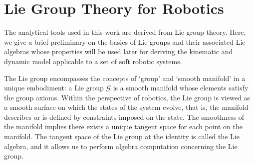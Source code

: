 \section{Lie Group Theory for Robotics}
The analytical tools used in this work are derived from Lie group theory. Here, we give a brief preliminary on the basics of Lie groups and their associated Lie algebras whose properties will be used later for deriving the kinematic and dynamic model applicable to a set of soft robotic systems. 

The Lie group encompasses the concepts of `group' and `smooth manifold' in a unique embodiment: a Lie group $\mathcal{G}$ is a smooth manifold whose elements satisfy the group axioms. Within the perspective of robotics, the Lie group is viewed as a smooth surface on which the states of the system evolve, that is, the manifold describes or is defined by constraints imposed on the state. The smoothness of the manifold implies there exists a unique tangent space for each point on the manifold. The tangent space of the Lie group at the identity is called the Lie algebra, and it allows us to perform algebra computation concerning the Lie group.

